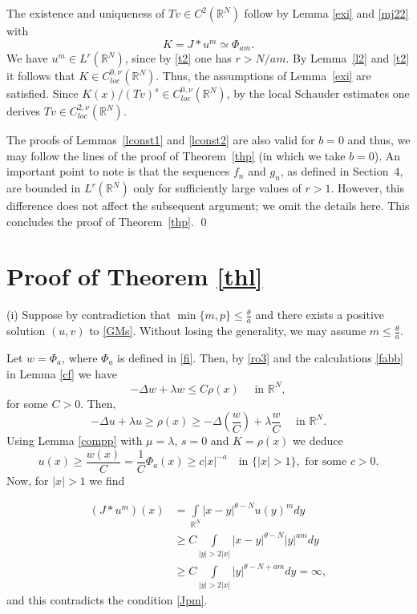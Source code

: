 \documentclass[leqno,12pt]{article}
\newcommand{\intl}{\int\limits}
\newcommand{\R}{\mathbb R}
\numberwithin{equation}{section}
\begin{document}
The existence and uniqueness of $Tv\in C^{2}(\R^N)$ follow by
Lemma \ref{exi} and \eqref{mj22} with 
$$
K=J * u^m\simeq \Phi_{am}.
$$ 
We have $u^m\in L^r(\R^N)$, since by \eqref{t2} one has $r>N/am$.
By Lemma~\ref{l2} and \eqref{t2} it follows that $K\in C^{0,\nu}_{loc}(\R^N)$.
Thus, the assumptions of Lemma~\ref{exi} are satisfied.
Since $K(x)/(Tv)^s\in C^{0,\nu}_{loc}(\R^N)$, by the local Schauder estimates one derives $Tv\in C^{2,\nu}_{loc}(\R^N)$.

The proofs of Lemmas~\ref{lconst1} and \ref{lconst2} are also valid for $b=0$ and thus, we may follow the lines of the proof of Theorem~\ref{thp} (in which we take $b=0$). 
An important point to note is that the sequences ${f_n}$ and ${g_n}$, as defined in Section~4, are bounded in $L^r(\mathbb{R}^N)$ only for sufficiently large values of $r > 1$.
However, this difference does not affect the subsequent argument; we omit the details here.
This concludes the proof of Theorem~\ref{thp}.
\qed


\section{Proof of Theorem \ref{thl}}

(i) Suppose by contradiction that $\min\{ m, p\}\leq\frac{\theta}{a}$ and there exists a positive solution $(u, v)$ to \eqref{GMs}. Without losing the generality, we may assume $m\leq \frac{\theta}{a}$. 

Let $w=\Phi_a$, where $\Phi_a$ is defined in \eqref{fi}. Then, by \eqref{ro3} and the calculations \eqref{fabb} in Lemma \ref{cf} we have
$$
-\Delta w+\lambda w\leq C \rho(x)\quad\mbox{ in }\R^N,
$$
for some $C>0$. Then, 
$$
-\Delta u+\lambda u\geq \rho(x)\geq -\Delta(\frac{w}{C})+\lambda \frac{w}{C} \quad\mbox{ in }\R^N.
$$
Using Lemma \ref{compp} with $\mu=\lambda$, $s=0$ and $K=\rho(x)$ we deduce 
$$
u(x)\geq \frac{w(x)}{C}=\frac{1}{C}\Phi_a(x)\geq c|x|^{-a}\quad\mbox{in } \{|x|>1\}, \mbox{ for some }c>0.
$$
Now, for $|x|>1$ we find

$$
\begin{aligned}
(J*u^m)(x)& =\intl_{\R^N} |x-y|^{\theta-N}u(y)^m dy\\
&\geq C \intl_{|y|>2|x|} |x-y|^{\theta-N}|y|^{am} dy\\
&\geq C\intl_{|y|>2|x|} |y|^{\theta-N+am} dy=\infty,
\end{aligned}
$$
and this contradicts the condition \eqref{Jpm}.
\end{document}
